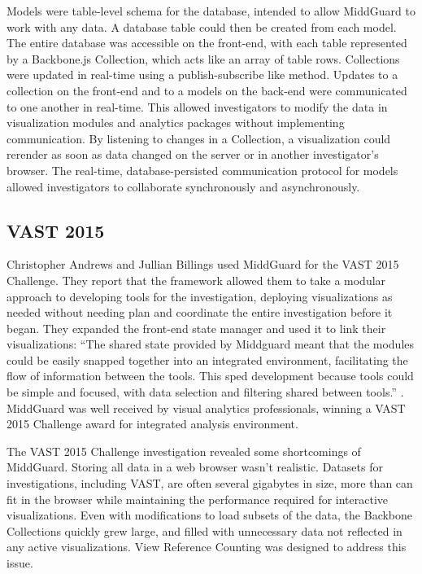 \documentclass[midd]{thesis}
\begin{document}
Models were table-level schema for the database, intended to allow MiddGuard to
work with any data. A database table could then be created from each model. The
entire database was accessible on the front-end, with each table represented by
a Backbone.js Collection, which acts like an array of table rows. Collections
were updated in real-time using a publish-subscribe like method. Updates to a
collection on the front-end and to a models on the back-end were communicated to
one another in real-time. This allowed investigators to modify the data in
visualization modules and analytics packages without implementing communication.
By listening to changes in a Collection, a visualization could rerender as soon
as data changed on the server or in another investigator's browser. The
real-time, database-persisted communication protocol for models allowed
investigators to collaborate synchronously and asynchronously.

\subsection{VAST 2015}

Christopher Andrews and Jullian Billings used MiddGuard for the VAST 2015
Challenge. They report that the framework allowed them to take a modular
approach to developing tools for the investigation, deploying visualizations as
needed without needing plan and coordinate the entire investigation before it
began. They expanded the front-end state manager and used it to link their
visualizations: ``The shared state provided by Middguard meant that the modules
could be easily snapped together into an integrated environment, facilitating
the flow of information between the tools. This sped development because tools
could be simple and focused, with data selection and filtering shared between
tools.'' \cite{middguard-dinofunworld}. MiddGuard was well received by visual
analytics professionals, winning a VAST 2015 Challenge award for integrated
analysis environment.

The VAST 2015 Challenge investigation revealed some shortcomings of MiddGuard.
Storing all data in a web browser wasn't realistic. Datasets for investigations,
including VAST, are often several gigabytes in size, more than can fit in the
browser while maintaining the performance required for interactive
visualizations. Even with modifications to load subsets of the data, the
Backbone Collections quickly grew large, and filled with unnecessary data not
reflected in any active visualizations. View Reference Counting was designed to
address this issue.
\end{document}

